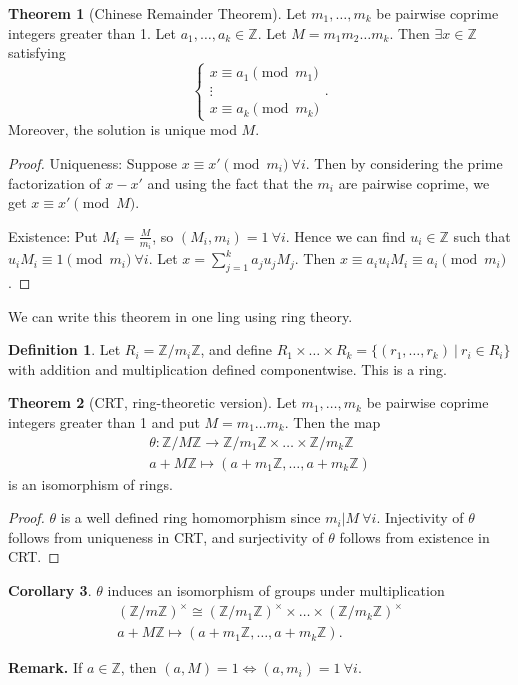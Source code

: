 \documentclass{article}
\theoremstyle{definition}
\newtheorem{theorem}{Theorem}[section]
\newtheorem{cor}[theorem]{Corollary}
\newtheorem{defn}{Definition}[section]
\begin{document}
\begin{theorem}[Chinese Remainder Theorem]
    Let $m_1,\ldots, m_k$ be pairwise coprime integers greater than 1. Let $a_1,\ldots, a_k \in \mathbb{Z}$. Let $M = m_1 m_2 \ldots m_k$. Then $\exists  x \in \mathbb{Z}$ satisfying 
    \[
    \begin{cases}
        x \equiv a_1 \pmod{m_1} \\
        \vdots \\
        x \equiv a_k \pmod{m_k}
        \end{cases}.
    \]
        Moreover, the solution is unique mod $M$.
\end{theorem}
\begin{proof}
    Uniqueness: Suppose $x \equiv x' \pmod{m_i} ~\forall i$. Then by considering the prime factorization of $x-x'$ and using the fact that the $m_i$ are pairwise coprime, we get $x \equiv x' \pmod{M}$.
    \vspace{1mm}
    
    Existence: Put $M_i = \frac{M}{m_i}$, so $(M_i, m_i) = 1 ~\forall i$. Hence we can find $u_i \in \mathbb{Z}$ such that $u_i M_i \equiv 1 \pmod{m_i} ~\forall i$. Let $x = \sum_{j=1}^{k} a_j u_j M_j$. Then $x \equiv a_iu_iM_i \equiv a_i \pmod{m_i}$.
\end{proof}
We can write this theorem in one ling using ring theory.
\begin{defn}
    Let $R_i = \mathbb{Z}/m_i\mathbb{Z}$, and define $R_1 \times \ldots \times R_k = \{(r_1,\ldots,r_k) ~|~ r_i \in R_i\}$ with addition and multiplication defined componentwise. This is a ring.
\end{defn}
\begin{theorem}[CRT, ring-theoretic version] %
    Let $m_1,\ldots, m_k$ be pairwise coprime integers greater than 1 and put $M = m_1\ldots m_k$. Then the map 
    \begin{align*}
        \theta: \mathbb{Z}/M\mathbb{Z} \to \mathbb{Z}/m_1\mathbb{Z} \times \ldots \times \mathbb{Z}/m_k\mathbb{Z} \\
        a + M\mathbb{Z} \mapsto (a + m_1\mathbb{Z}, \ldots, a + m_k\mathbb{Z})
    \end{align*}
    is an isomorphism of rings.
\end{theorem}
\begin{proof}
    $\theta$ is a well defined ring homomorphism since $m_i | M ~\forall i$. Injectivity of $\theta$ follows from uniqueness in CRT, and surjectivity of $\theta$ follows from existence in CRT.
\end{proof}
\begin{cor}
    $\theta$ induces an isomorphism of groups under multiplication 
    \begin{align*}
        (\mathbb{Z}/m\mathbb{Z})^\times \cong (\mathbb{Z}/m_1\mathbb{Z})^\times \times \ldots \times (\mathbb{Z}/m_k\mathbb{Z})^\times \\
        a + M\mathbb{Z} \mapsto (a + m_1\mathbb{Z}, \ldots, a+m_k\mathbb{Z}).
    \end{align*}
\end{cor}
\textbf{Remark.} If $a \in \mathbb{Z}$, then $(a,M) = 1 \iff (a,m_i) = 1 ~\forall i$.
\end{document}
